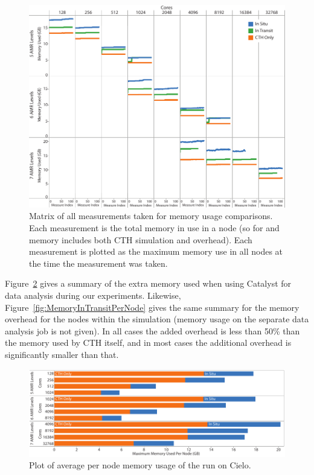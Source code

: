 \begin{figure}[htb]
  \centering
  \includegraphics[width=\linewidth]{figures/MemoryUsageAll}
  \caption[Memory usage plot matrix.]{Matrix of all measurements taken for
    memory usage comparisons.  Each measurement is the total memory in use
    in a node (so for \insitu and \intransit memory includes both CTH
    simulation and overhead).  Each measurement is plotted as the maximum
    memory use in all nodes at the time the measurement was taken.}
  \label{fig:MemoryUsageAll}
\end{figure}

Figure~\ref{fig:MemoryInSituPerNode} gives a summary of the extra memory
used when using Catalyst for \insitu data analysis during our experiments.
Likewise, Figure~\ref{fig:MemoryInTransitPerNode} gives the same summary
for the \intransit memory overhead for the nodes within the simulation
(memory usage on the separate data analysis job is not given).  In all cases the
added overhead is less than 50\% than the memory used by CTH itself, and in
most cases the additional overhead is significantly smaller than that.

\begin{figure}[htb]
  \centering
  \includegraphics[width=\linewidth]{figures/MemoryUsageInSituPerNode}
  \caption{Plot of average per node memory usage of the \insitu run on Cielo.}
  \label{fig:MemoryInSituPerNode}
\end{figure}

